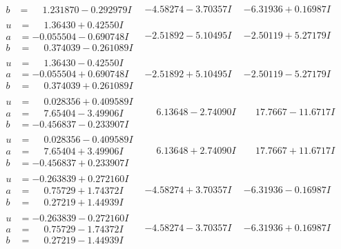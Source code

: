 \documentclass[1p]{elsarticle_modified}
\theoremstyle{definition}
\begin{document}
$$\begin{array}{c|c|c}
\begin{aligned}
b &= \phantom{-}1.231870 - 0.292979 I\end{aligned}
 & -4.58274 - 3.70357 I & -6.31936 + 0.16987 I \\ \hline\begin{aligned}
u &= \phantom{-}1.36430 + 0.42550 I \\
a &= -0.055504 - 0.690748 I \\
b &= \phantom{-}0.374039 - 0.261089 I\end{aligned}
 & -2.51892 - 5.10495 I & -2.50119 + 5.27179 I \\ \hline\begin{aligned}
u &= \phantom{-}1.36430 - 0.42550 I \\
a &= -0.055504 + 0.690748 I \\
b &= \phantom{-}0.374039 + 0.261089 I\end{aligned}
 & -2.51892 + 5.10495 I & -2.50119 - 5.27179 I \\ \hline\begin{aligned}
u &= \phantom{-}0.028356 + 0.409589 I \\
a &= \phantom{-}7.65404 - 3.49906 I \\
b &= -0.456837 - 0.233907 I\end{aligned}
 & \phantom{-}6.13648 - 2.74090 I & \phantom{-}17.7667 - 11.6717 I \\ \hline\begin{aligned}
u &= \phantom{-}0.028356 - 0.409589 I \\
a &= \phantom{-}7.65404 + 3.49906 I \\
b &= -0.456837 + 0.233907 I\end{aligned}
 & \phantom{-}6.13648 + 2.74090 I & \phantom{-}17.7667 + 11.6717 I \\ \hline\begin{aligned}
u &= -0.263839 + 0.272160 I \\
a &= \phantom{-}0.75729 + 1.74372 I \\
b &= \phantom{-}0.27219 + 1.44939 I\end{aligned}
 & -4.58274 + 3.70357 I & -6.31936 - 0.16987 I \\ \hline\begin{aligned}
u &= -0.263839 - 0.272160 I \\
a &= \phantom{-}0.75729 - 1.74372 I \\
b &= \phantom{-}0.27219 - 1.44939 I\end{aligned}
 & -4.58274 - 3.70357 I & -6.31936 + 0.16987 I \\ \hline\begin{aligned}

\end{aligned}
\end{array}$$
\end{document}
